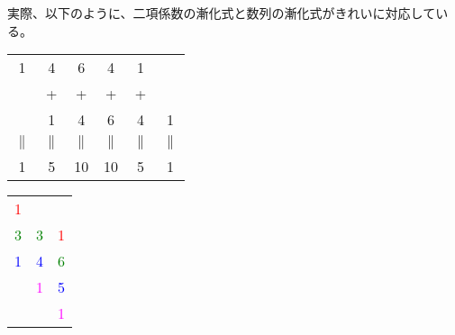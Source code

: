 \documentclass[dvipdfmx,12pt]{beamer}
\begin{document}
\begin{frame}
\frametitle{}
実際、以下のように、二項係数の漸化式と数列の漸化式がきれいに対応している。

\begin{multicols}{2}

\begin{table}
\begin{tabular}{cccccc}
1&4&6&4&1&\\
&+&+&+&+&\\
&1&4&6&4&1\\
$\parallel$&$\parallel$&$\parallel$&$\parallel$&$\parallel$&$\parallel$\\
1&5&10&10&5&1
\end{tabular}
\end{table}
\begin{table}
\begin{tabular}{ccc}
\textcolor{red}{1}&&\\
\textcolor{green}{3}&\textcolor{green}{3}&\textcolor{red}{1}\\
\textcolor{blue}{1}&\textcolor{blue}{4}&\textcolor{green}{6}\\
&\textcolor{magenta}{1}&\textcolor{blue}{5}\\
&&\textcolor{magenta}{1}\\
\end{tabular}
\end{table}
\end{multicols}
\end{frame}
\end{document}
